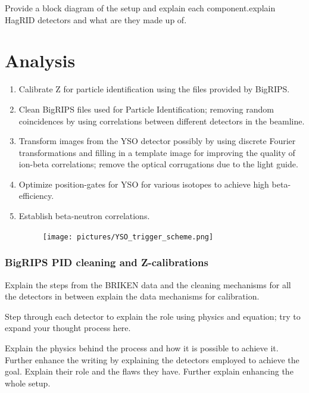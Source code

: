 \documentclass[a4paper,12pt,twoside]{report}
\begin{document}
Provide a block diagram of the setup and explain each component.explain HagRID detectors and what are they made up of. 


\newpage

\chapter{Analysis}

\begin{enumerate}
    \item Calibrate Z for particle identification using the files provided by BigRIPS.
    \item Clean BigRIPS files used for Particle Identification; removing random coincidences by using correlations between different detectors in the beamline. 
    \item Transform images from the YSO detector possibly by using discrete Fourier transformations and filling in a template image for improving the quality of ion-beta correlations; remove the optical corrugations due to the light guide.
    \item Optimize position-gates for YSO for various isotopes to achieve high beta-efficiency.
    \item Establish beta-neutron correlations.
    
    
    
\begin{figure}[h!]
    \centering
    \texttt{[image: pictures/YSO\_trigger\_scheme.png]}
    \caption[]{}
    \label{fig:yso_trigger_scheme}
\end{figure}
    
    
\end{enumerate}

\subsection{BigRIPS PID cleaning and Z-calibrations}

Explain the steps from the BRIKEN data and the cleaning mechanisms for all the detectors in between explain the data mechanisms for calibration.

Step through each detector to explain the role using physics and equation; try to expand your thought process here.

Explain the physics behind the process and how it is possible to achieve it. Further enhance the writing by explaining the detectors employed to achieve the goal. Explain their role and the flaws they have. Further explain enhancing the whole setup.
\end{document}
